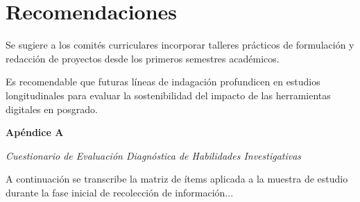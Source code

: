 \documentclass[12pt,letterpaper]{article}
\begin{document}
\clearpage
\section{Recomendaciones}

Se sugiere a los comités curriculares incorporar talleres prácticos de formulación y redacción de proyectos desde los primeros semestres académicos.

Es recomendable que futuras líneas de indagación profundicen en estudios longitudinales para evaluar la sostenibilidad del impacto de las herramientas digitales en posgrado.

\printbibliography[heading=apa7bib]

\clearpage
\begin{center}
    {\bfseries Apéndice A\par}
    \vspace{6pt}
    {\itshape Cuestionario de Evaluación Diagnóstica de Habilidades Investigativas\par}
\end{center}
\vspace{18pt}

A continuación se transcribe la matriz de ítems aplicada a la muestra de estudio durante la fase inicial de recolección de información...
\end{document}
